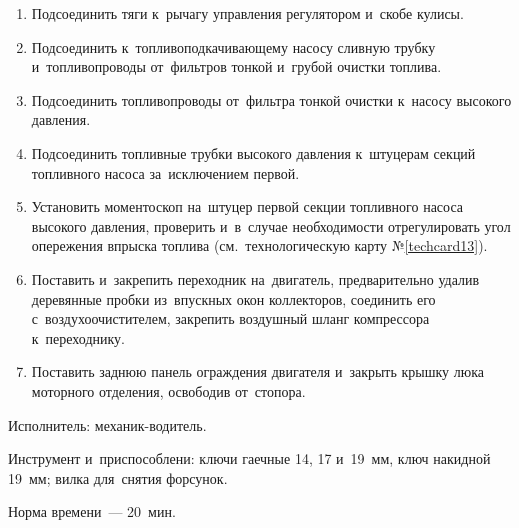 \begin{enumerate}
    Зазор между торцами кулачков ведущей полумуфты и~передним концом муфты опережения, так~же, как~и~зазор между кулачками муфты опережения и~задним торцом ведущей полумуфты должен быть не~менее 0,3~мм. 
        
    Проверка обязательна для~всех четырех кулачков. 
    \item Подсоединить тяги к~рычагу управления регулятором и~скобе кулисы. 
    \item Подсоединить к~топливоподкачивающему насосу сливную трубку и~топливопроводы от~фильтров тонкой и~грубой очистки топлива. 
    \item Подсоединить топливопроводы от~фильтра тонкой очистки к~насосу высокого давления. 
    \item Подсоединить топливные трубки высокого давления к~штуцерам секций топливного насоса за~исключением первой. 
    \item Установить моментоскоп на~штуцер первой секции топливного насоса высокого давления, проверить и~в~случае необходимости отрегулировать угол опережения впрыска топлива (см.~технологическую карту №\ref{techcard13}).  
    \item Поставить и~закрепить переходник на~двигатель, предварительно удалив деревянные пробки из~впускных окон коллекторов, соединить его с~воздухоочистителем, закрепить воздушный шланг компрессора к~переходнику.  
    \item Поставить заднюю панель ограждения двигателя и~закрыть крышку люка моторного отделения, освободив от~стопора. 
\end{enumerate}


\noindent
Исполнитель: механик-водитель. 

\noindent
Инструмент и~приспособлени: ключи гаечные 14, 17 и~19~мм, ключ накидной 19~мм; вилка для~снятия форсунок. 

\noindent
Норма времени~--- 20~мин. 

